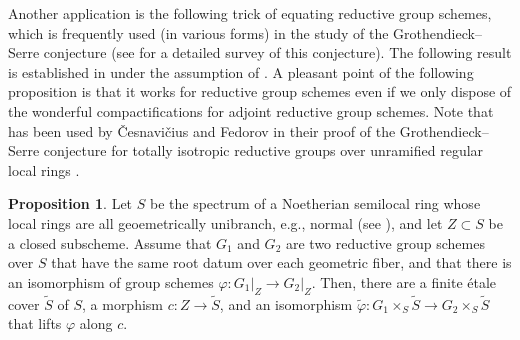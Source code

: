 \documentclass[11pt, reqno]{amsart}
\theoremstyle{plain}
\theoremstyle{definition}
\newtheorem{proposition}[theorem]{Proposition}
\begin{document}
Another application is the following trick of equating reductive group schemes, which is frequently used (in various forms) in the study of the Grothendieck--Serre conjecture (see \cite[Section~3.1]{CKproblemtorsors} for a detailed survey of this conjecture). The following result is established in \cite[Proposition 6.2.5]{CKproblemtorsors} under the assumption of . A pleasant point of the following proposition is that it works for reductive group schemes even if we only dispose of the wonderful compactifications for adjoint reductive group schemes. Note that  has been used by \v{C}esnavi\v{c}ius and Fedorov in their proof of the Grothendieck--Serre conjecture for totally isotropic reductive groups over unramified regular local rings \cite{unramifiedisotropicGrothendieckserre}.

\begin{proposition}\label{equatinggroup}
    Let $S$ be the spectrum of a Noetherian semilocal ring whose local rings are all geoemetrically unibranch, e.g., normal (see \cite[23.2.1]{EGAIV1}), and let $Z\subset S$ be a closed subscheme. Assume that $G_1$ and $G_2$ are two reductive group schemes over $S$ that have the same root datum over each geometric fiber, and that there is an isomorphism of group schemes $\varphi: G_1\vert_{Z}\rightarrow G_2\vert_{Z}$. Then, there are a finite étale cover $\widetilde{S}$ of $S$, a morphism $c: Z\rightarrow \widetilde{S}$, and an isomorphism $\widetilde{\varphi}:G_1\times_S \widetilde{S}\rightarrow G_2\times_S \widetilde{S}$ that lifts $\varphi$ along $c$.
\end{proposition}
\end{document}
